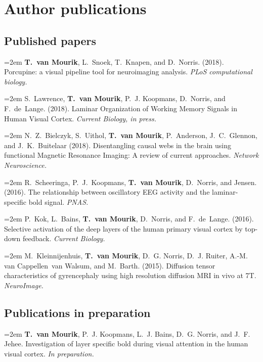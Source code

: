 \section{Author publications}
\vspace{20pt}
\subsection{Published papers}
\vspace{10pt}
\hangindent=2em
\noindent
{\textbf{T.~van Mourik}, L.~Snoek, T.~Knapen, and D.~Norris.} 
(2018).
Porcupine: a visual pipeline tool for neuroimaging analysis.
\emph{PLoS computational biology.}


\hangindent=2em
\noindent
{S.~Lawrence, \textbf{T.~van Mourik}, P.~J. Koopmans, D.~Norris, and F.~de~Lange.} 
(2018).
Laminar Organization of Working Memory Signals in Human Visual Cortex. 
\emph{Current Biology, in press.}


\hangindent=2em
\noindent
{N.~Z.~Bielczyk, S.~Uithol, \textbf{T.~van Mourik}, P.~Anderson, J.~C.~Glennon, and J.~K.~Buitelaar} 
(2018).
Disentangling causal webs in the brain using functional Magnetic Resonance Imaging: A review of current approaches.
\emph{Network Neuroscience.}


\hangindent=2em
\noindent
{R.~Scheeringa, P.~J.~Koopmans, \textbf{T.~van Mourik}, D.~Norris, and Jensen.} 
(2016).
The relationship between oscillatory {EEG} activity and the laminar-specific bold signal.
\emph{PNAS.}


\hangindent=2em
\noindent
{P.~Kok, L.~Bains, \textbf{T.~van Mourik}, D.~Norris, and F.~de~Lange.} 
(2016).
Selective activation of the deep layers of the human primary visual	cortex by top-down feedback.
\emph{Current Biology.}


\hangindent=2em
\noindent
{M.~Kleinnijenhuis, \textbf{T.~van Mourik}, D.~G. Norris, D.~J. Ruiter, A.-M. van	Cappellen~van Walsum, and M.~Barth.} 
(2015).
Diffusion tensor characteristics of gyrencephaly using high	resolution diffusion {MRI} in vivo at 7{T}.
\emph{NeuroImage.}

\vspace{10pt}

\subsection{Publications in preparation}
\vspace{10pt}
\hangindent=2em
\noindent
{\textbf{T.~van Mourik}, P.~J. Koopmans, L.~J. Bains, D.~G. Norris, and J.~F. Jehee.} 
Investigation of layer specific bold during visual attention in the human visual cortex.
\emph{In preparation.}


